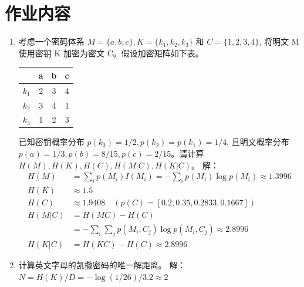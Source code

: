 \documentclass[degree=project,degree-type=project,cjk-font=noto]{thuthesis}
\begin{document}
\maketitle

\frontmatter
% 



\mainmatter

\chapter{作业内容}

\begin{enumerate}
  \setlength{\itemsep}{3\parskip}
  \item 考虑一个密码体系 $M = \{a, b, c\}, K = \{k_1, k_2, k_3\}$ 和 $C = \{1, 2, 3, 4\}$, 将明文 M 使用密钥 K 加密为密文 C。假设加密矩阵如下表。
  \begin{table}[htp]
  	\centering
  	\begin{tabular}{|c|c|c|c|}
  		\hline
  		& a & b & c \\\hline
  		$k_1$ & 2 & 3 & 4 \\\hline
  		$k_2$ & 3 & 4 & 1 \\\hline
  		$k_3$ & 1 & 2 & 3 \\\hline
	\end{tabular}
  \end{table}
  \newline
  已知密钥概率分布 $p(k_3) = 1/2, p(k_2) = p(k_1) = 1/4$, 且明文概率分布 $p(a) = 1/3, p(b) = 8/15, p(c)  = 2/15$。请计算 $H(M), H(K), H(C), H(M|C), H(K|C)$。
  \newline
  {\heiti 解：}
  \begin{align}
  	H(M) &= \sum_i p(M_i) I(M_i) = -\sum_i p(M_i) \log p(M_i) \approx 1.3996 \\
  	H(K) &\approx 1.5 \\
  	H(C) &\approx 1.9408 \quad (p(C) = [0.2, 0.35, 0.2833, 0.1667]) \\
  	H(M|C) &= H(MC) - H(C) \nonumber \\
          &= -\sum_i \sum_j p(M_i, C_j) \log p(M_i, C_j) \approx 2.8996 \\
  	H(K|C) &= H(KC) - H(C) \approx 2.8996
  \end{align}

\item 计算英文字母的凯撒密码的唯一解距离。
\newline
{\heiti 解：}
\newline
$N = H(K) / D = - \log(1/26) / 3.2 \approx 2$
\newline


\end{enumerate}
\end{document}
